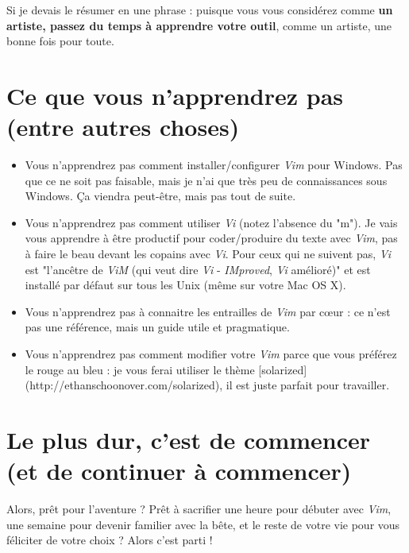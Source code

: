 Si je devais le résumer en une phrase : puisque vous vous considérez comme {\bf un artiste, passez du temps à apprendre votre outil}, comme un artiste, une bonne fois pour toute.

\section{Ce que vous n'apprendrez pas (entre autres choses)}

\begin{itemize}
    \item Vous n'apprendrez pas comment installer/configurer {\em Vim} pour Windows. Pas que ce ne soit pas faisable, mais je n'ai que très peu de connaissances sous Windows. Ça viendra peut-être, mais pas tout de suite.
    \item Vous n'apprendrez pas comment utiliser \emph{Vi} (notez l'absence du "m"). Je vais vous apprendre à être productif pour coder/produire du texte avec \emph{Vim}, pas à faire le beau devant les copains avec \emph{Vi}. Pour ceux qui ne suivent pas, \emph{Vi} est "l'ancêtre de \emph{ViM} (qui veut dire \emph{Vi} - \emph{IMproved}, \emph{Vi} amélioré)" et est installé par défaut sur tous les Unix (même sur votre Mac OS X).
    \item Vous n'apprendrez pas à connaitre les entrailles de \emph{Vim} par c\oe ur : ce n'est pas une référence, mais un guide utile et pragmatique.
    \item Vous n'apprendrez pas comment modifier votre \emph{Vim} parce que vous préférez le rouge au bleu : je vous ferai utiliser le thème [solarized](http://ethanschoonover.com/solarized), il est juste parfait pour travailler.
\end{itemize}

\section{Le plus dur, c'est de commencer (et de continuer à commencer)}

Alors, prêt pour l'aventure ? Prêt à sacrifier une heure pour débuter avec \emph{Vim}, une semaine pour devenir familier avec la bête, et le reste de votre vie pour vous féliciter de votre choix ? Alors c'est parti !


